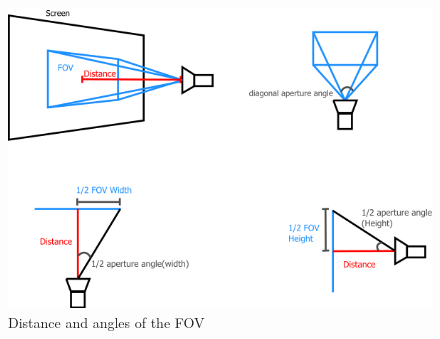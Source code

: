 \documentclass[journal,final,a4paper,twoside]{PS}
\begin{document}
\begin{figure}[h]
\begin{center}
\includegraphics[scale=0.45]{./pics/distanceandangles.png}
\caption{Distance and angles of the FOV}
\label{fig:dist}
\end{center}
\end{figure}
\end{document}

